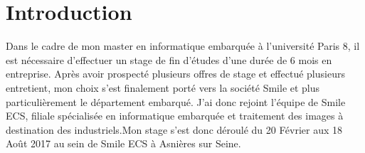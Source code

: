 \chapter*{Introduction}

Dans le cadre de mon master en informatique embarquée à l'université Paris 8, il est nécessaire d’effectuer un stage de fin d’études d’une durée de 6 mois en entreprise. Après avoir prospecté plusieurs offres de stage et effectué plusieurs entretient, mon choix s’est finalement porté vers la société Smile et plus particulièrement le département embarqué. J’ai donc rejoint l'équipe de Smile ECS, filiale spécialisée en informatique embarquée et traitement des images à destination des industriels.Mon stage s’est donc déroulé du 20 Février aux 18 Août 2017 au sein de Smile ECS à Asnières sur Seine.